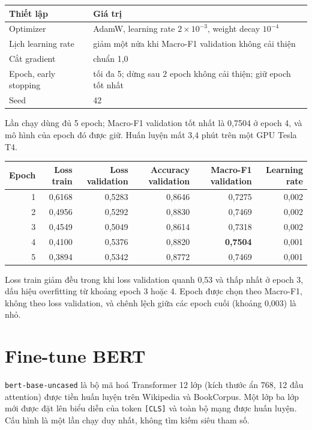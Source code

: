 \begin{center}
\begin{tabular}{@{}p{5cm}p{9cm}@{}}
    \toprule
    Thiết lập & Giá trị \\
    \midrule
    Optimizer & AdamW, learning rate $2\times10^{-3}$, weight decay $10^{-4}$ \\
    Lịch learning rate & giảm một nửa khi Macro-F1 validation không cải thiện \\
    Cắt gradient & chuẩn 1,0 \\
    Epoch, early stopping & tối đa 5; dừng sau 2 epoch không cải thiện; giữ epoch tốt nhất \\
    Seed & 42 \\
    \bottomrule
\end{tabular}
\end{center}

Lần chạy dùng đủ 5 epoch; Macro-F1 validation tốt nhất là 0,7504 ở epoch 4, và mô hình của epoch đó được giữ. Huấn luyện mất 3,4 phút trên một GPU Tesla T4.

\begin{center}
\small
\begin{tabular}{@{}rrrrrr@{}}
    \toprule
    Epoch & Loss train & Loss validation & Accuracy validation & Macro-F1 validation & Learning rate \\
    \midrule
    1 & 0,6168 & 0,5283 & 0,8646 & 0,7275 & 0,002 \\
    2 & 0,4956 & 0,5292 & 0,8830 & 0,7469 & 0,002 \\
    3 & 0,4549 & 0,5049 & 0,8614 & 0,7318 & 0,002 \\
    4 & 0,4100 & 0,5376 & 0,8820 & \textbf{0,7504} & 0,001 \\
    5 & 0,3894 & 0,5342 & 0,8772 & 0,7469 & 0,001 \\
    \bottomrule
\end{tabular}
\end{center}

Loss train giảm đều trong khi loss validation quanh 0,53 và thấp nhất ở epoch 3, dấu hiệu overfitting từ khoảng epoch 3 hoặc 4. Epoch được chọn theo Macro-F1, không theo loss validation, và chênh lệch giữa các epoch cuối (khoảng 0,003) là nhỏ.

\section{Fine-tune BERT}
\label{sec:6-5}

\texttt{bert-base-uncased} là bộ mã hoá Transformer 12 lớp (kích thước ẩn 768, 12 đầu attention) được tiền huấn luyện trên Wikipedia và BookCorpus. Một lớp ba lớp mới được đặt lên biểu diễn của token \texttt{[CLS]} và toàn bộ mạng được huấn luyện. Cấu hình là một lần chạy duy nhất, không tìm kiếm siêu tham số.


